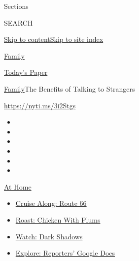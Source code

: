 Sections

SEARCH

\protect\hyperlink{site-content}{Skip to
content}\protect\hyperlink{site-index}{Skip to site index}

\href{https://www.nytimes3xbfgragh.onion/section/well/family}{Family}

\href{https://myaccount.nytimes3xbfgragh.onion/auth/login?response_type=cookie\&client_id=vi}{}

\href{https://www.nytimes3xbfgragh.onion/section/todayspaper}{Today's
Paper}

\href{/section/well/family}{Family}\textbar{}The Benefits of Talking to
Strangers

\url{https://nyti.ms/3i2Stgs}

\begin{itemize}
\item
\item
\item
\item
\item
\item
\end{itemize}

\href{https://www.nytimes3xbfgragh.onion/spotlight/at-home?action=click\&pgtype=Article\&state=default\&region=TOP_BANNER\&context=at_home_menu}{At
Home}

\begin{itemize}
\tightlist
\item
  \href{https://www.nytimes3xbfgragh.onion/2020/09/07/travel/route-66.html?action=click\&pgtype=Article\&state=default\&region=TOP_BANNER\&context=at_home_menu}{Cruise
  Along: Route 66}
\item
  \href{https://www.nytimes3xbfgragh.onion/2020/09/04/dining/sheet-pan-chicken.html?action=click\&pgtype=Article\&state=default\&region=TOP_BANNER\&context=at_home_menu}{Roast:
  Chicken With Plums}
\item
  \href{https://www.nytimes3xbfgragh.onion/2020/09/04/arts/television/dark-shadows-stream.html?action=click\&pgtype=Article\&state=default\&region=TOP_BANNER\&context=at_home_menu}{Watch:
  Dark Shadows}
\item
  \href{https://www.nytimes3xbfgragh.onion/interactive/2020/at-home/even-more-reporters-editors-diaries-lists-recommendations.html?action=click\&pgtype=Article\&state=default\&region=TOP_BANNER\&context=at_home_menu}{Explore:
  Reporters' Google Docs}
\end{itemize}

